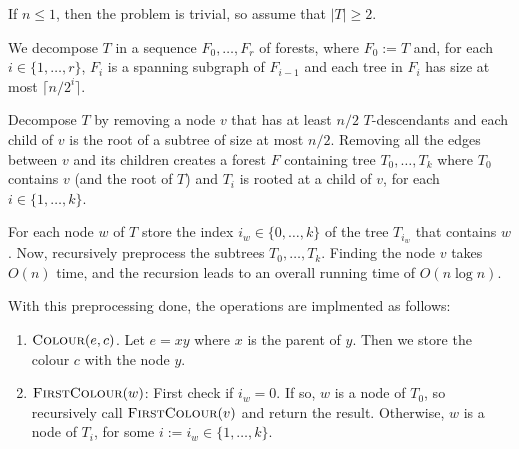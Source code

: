 \documentclass[kpfonts]{patmorin}
\let\le\leqslant
\let\ge\geqslant
\begin{document}
\begin{lem}
    If $n\le 1$, then the problem is trivial, so assume that $|T|\ge 2$.
    
    We decompose $T$ in a sequence $F_0,\ldots,F_r$ of forests, where $F_0:=T$ and, for each $i\in\{1,\ldots,r\}$, $F_i$ is a spanning subgraph of $F_{i-1}$ and each tree in $F_i$ has size at most $\lceil n/2^i\rceil$.  

    Decompose $T$ by removing a node $v$ that has at least $n/2$ $T$-descendants and each child of $v$ is the root of a subtree of size at most $n/2$. Removing all the edges between $v$ and its children creates a forest $F$ containing tree $T_0,\ldots,T_k$ where $T_0$ contains $v$ (and the root of $T$) and $T_i$ is rooted at a child of $v$, for each $i\in\{1,\ldots,k\}$.

    
    For each node $w$ of $T$ store the index $i_w\in\{0,\ldots,k\}$ of the tree $T_{i_w}$ that contains $w$.  Now, recursively preprocess the subtrees $T_0,\ldots,T_k$.  Finding the node $v$ takes $O(n)$ time, and the recursion leads to an overall running time of $O(n\log n)$.
    
    With this preprocessing done, the operations are implmented as follows:
    \begin{enumerate}
    \item $\textsc{Colour}(e,c)$. Let $e=xy$ where $x$ is the parent of $y$.  Then we store the colour $c$ with the node $y$.
    
    \item $\textsc{FirstColour}(w)$:  First check if $i_w=0$.  If so, $w$ is a node of $T_0$, so recursively call $\textsc{FirstColour}(v)$ and return the result.  Otherwise, $w$ is a node of $T_{i}$, for some $i:=i_w\in\{1,\ldots,k\}$.  
    \end{enumerate}
    
  
\end{lem}
\end{document}
